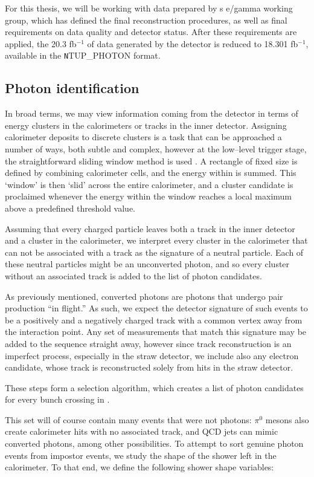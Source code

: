 For this thesis, we will be working with data prepared by \atlas{}s e/gamma working group, which has defined the final reconstruction procedures, as well as final requirements on data quality and detector status. After these requirements are applied, the 20.3 fb$^{-1}$ of data generated by the \atlas{} detector is reduced to 18.301 fb$^{-1}$, available in the {\texttt NTUP\_PHOTON} format.


\subsection{Photon identification}
In broad terms, we may view information coming from the detector in terms of energy clusters in the calorimeters or tracks in the inner detector. Assigning calorimeter deposits to discrete clusters is a task that can be approached a number of ways, both subtle and complex, however at the low--level trigger stage, the straightforward sliding window method is used \cite{atlascluster:sw}. A rectangle of fixed size is defined by combining calorimeter cells, and the energy within is summed. This `window' is then `slid' across the entire calorimeter, and a cluster candidate is proclaimed whenever the energy within the window reaches a local maximum above a predefined threshold value.

Assuming that every charged particle leaves both a track in the inner detector and a cluster in the calorimeter, we interpret every cluster in the calorimeter that can not be associated with a track as the signature of a neutral particle. Each of these neutral particles might be an unconverted photon, and so every cluster without an associated track is added to the list of photon candidates.

As previously mentioned, converted photons are photons that undergo pair production ``in flight.'' As such, we expect the detector signature of such events to be a positively and a negatively charged track with a common vertex away from the interaction point. Any set of measurements that match this signature may be added to the sequence straight away, however since track reconstruction is an imperfect process, especially in the straw detector, we include also any electron candidate, whose track is reconstructed solely from hits in the straw detector.

These steps form a selection algorithm, which creates a list of photon candidates for every bunch crossing in \atlas{} \cite{phorec}.

This set will of course contain many events that were not photons: $\pi^0$ mesons also create calorimeter hits with no associated track, and QCD jets can mimic converted photons, among other possibilities. To attempt to sort genuine photon events from impostor events, we study the shape of the shower left in the calorimeter. To that end, we define the following shower shape variables:

